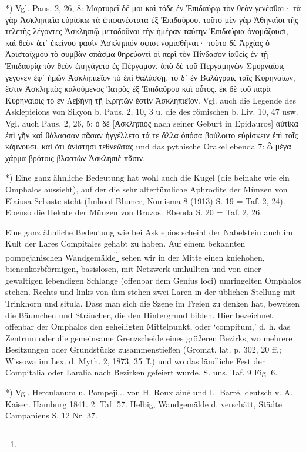 \documentclass[a4paper, 11pt, oneside]{article}
\begin{document}
*) Vgl. Paus. 2, 26, 8: Μαρτυρεῖ δέ μοι καὶ τόδε ἐν Ἐπιδαύρῳ τὸν θεὸν γενέσθαι· τὰ γὰρ Ἀσκληπιεῖα εὑρίσκω τὰ ἐπιφανέστατα ἐξ Ἐπιδαύρου. τοῦτο μὲν γὰρ Ἀθηναῖοι τῆς τελετῆς λέγοντες Ἀσκληπιῷ μεταδοῦναι τὴν ἡμέραν ταύτην Ἐπιδαύρια ὀνομάζουσι, καὶ θεὸν ἀπ᾽ ἐκείνου φασὶν Ἀσκληπιόν σφισι νομισθῆναι· τοῦτο δὲ Ἀρχίας ὁ Ἀρισταίχμου τὸ συμβὰν σπάσμα θηρεύοντί οἱ περὶ τὸν Πίνδασον ἰαθεὶς ἐν τῇ Ἐπιδαυρίᾳ τὸν θεὸν ἐπηγάγετο ἐς Πέργαμον. ἀπὸ δὲ τοῦ Περγαμηνῶν Σμυρναίοις γέγονεν ἐφ᾽ ἡμῶν Ἀσκληπιεῖον τὸ ἐπὶ θαλάσσῃ. τὸ δ᾽ ἐν Βαλάγραις ταῖς Κυρηναίων, ἔστιν Ἀσκληπιὸς καλούμενος Ἰατρὸς ἐξ Ἐπιδαύρου καὶ οὗτος. ἐκ δὲ τοῦ παρὰ Κυρηναίοις τὸ ἐν Λεβήνῃ τῇ Κρητῶν ἐστὶν Ἀσκληπιεῖον. Vgl. auch die Legende des Asklepieions von Sikyon b. Paus. 2, 10, 3 u. die des römischen b. Liv. 10, 47 usw. Vgl. auch Paus. 2, 26, 5: ὁ δὲ [Ἀσκληπιός nach seiner Geburt in Epidauros] αὐτίκα ἐπὶ γῆν καὶ θάλασσαν πᾶσαν ἠγγέλλετο τά τε ἄλλα ὁπόσα βούλοιτο εὑρίσκειν ἐπὶ τοῖς κάμνουσι, καὶ ὅτι ἀνίστησι τεθνεῶτας und das pythische Orakel ebenda 7: ὦ μέγα χάρμα βρότοις βλαστὼν Ἀσκληπιὲ πᾶσιν.

*) Eine ganz ähnliche Bedeutung hat wohl auch die Kugel (die beinahe wie ein Omphalos aussieht), auf der die sehr altertümliche Aphrodite der Münzen von Elaiusa Sebaste steht (Imhoof-Blumer, Nomisma 8 (1913) S. 19 = Taf. 2, 24). Ebenso die Hekate der Münzen von Bruzos. Ebenda S. 20 = Taf. 2, 26.

Eine ganz ähnliche Bedeutung wie bei Asklepios scheint der Nabelstein auch im Kult der Lares Compitales gehabt zu haben. Auf einem bekannten pompejanischen Wandgemälde\footnote{} sehen wir in der Mitte einen kniehohen, bienenkorbförmigen, basislosen, mit Netzwerk umhüllten und von einer gewaltigen lebendigen Schlange (offenbar dem Genius loci) umringelten Omphalos stehen. Rechts und links von ihm stehen zwei Laren in der üblichen Stellung mit Trinkhorn und situla. Dass man sich die Szene im Freien zu denken hat, beweisen die Bäumchen und Sträucher, die den Hintergrund bilden. Hier bezeichnet offenbar der Omphalos den geheiligten Mittelpunkt, oder `compitum,' d. h. das Zentrum oder die gemeinsame Grenzscheide eines größeren Bezirks, wo mehrere Besitzungen oder Grundstücke zusammenstießen (Gromat. lat. p. 302, 20 ff.; Wissowa im Lex. d. Myth. 2, 1873, 35 ff.) und wo das ländliche Fest der Compitalia oder Laralia nach Bezirken gefeiert wurde. S. uns. Taf. 9 Fig. 6.

*) Vgl. Herculanum u. Pompeji... von H. Roux ainé und L. Barré, deutsch v. A. Kaiser. Hamburg 1841. 2. Taf. 57. Helbig, Wandgemälde d. verschätt, Städte Campaniens S. 12 Nr. 37.
\end{document}
